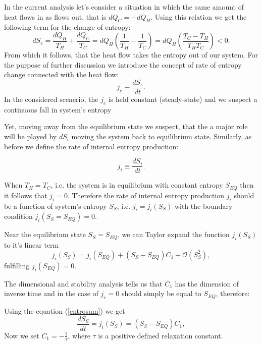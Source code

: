 \documentclass[a4paper,12pt,nofootinbib]{article}
\begin{document}
In the current analysis let's consider a situation in which the same amount of heat flows in as flows out, that is $dQ_C=-dQ_H$. Using this relation we get the following term for the change of entropy:
\begin{equation}
dS_e=\frac{dQ_H}{T_H}+\frac{dQ_C}{T_C}=dQ_H\left(\frac{1}{T_H}-\frac{1}{T_C}\right)
=dQ_H\left(\frac{T_C-T_H}{T_HT_C}\right)<0.
\label{dSe1}
\end{equation}
From which it follows, that the heat flow takes the entropy out of our system.
For the purpose of further discussion we introduce the concept of rate of entropy change connected with the heat flow:
\begin{equation}
j_e \equiv  \frac{dS_e}{dt}. 
\end{equation}
In the considered scenerio, the $j_e$ is held constant (steady-state) and we suspect a continuous fall in system's entropy

Yet, moving away from the equilibrium state we suspect, that the a major role will be played by $dS_i$ moving the system back to equilibrium state. Similarly, as before we define the rate of internal entropy production:

\begin{equation}
j_i \equiv \frac{dS_i}{dt}.   
\end{equation} 

When $T_H=T_C$, i.e. the system is in equilibrium with constant entropy $S_{EQ}$ then it follows that $j_i=0$.
Therefore the rate of internal entropy production $j_i$ should be a function  of system's entropy $S_S$, i.e. $j_i = j_i(S_S)$ with the boundary condition $j_i(S_S=S_{EQ})=0$. 

Near the equilibrium state $S_S=S_{EQ}$, we can Taylor expand the function $j_i(S_S)$ to it's linear term
\begin{equation}
j_i(S_S)=j_i\left(S_{EQ}\right)+\left(S_S-S_{EQ}\right)C_1+\mathcal{O}\left(S_S^2\right),
\end{equation} 
fulfilling $j_i\left(S_{EQ}\right)=0$. 

The dimensional and stability analysis tells us that $C_1$ has the dimension of inverse time and in the case of 
$j_e=0$ should simply be equal to $S_{EQ}$, therefore:

Using the equation (\ref{entrosum}) we get
\begin{equation}
\frac{dS_S}{dt}=j_i\left(S_S\right)=\left(S_S-S_{EQ}\right)C_1, 
\label{stab}
\end{equation} 
Now we set $C_1 = -\frac{1}{\tau}$, where $\tau$ is a positive defined relaxation constant.
\end{document}
